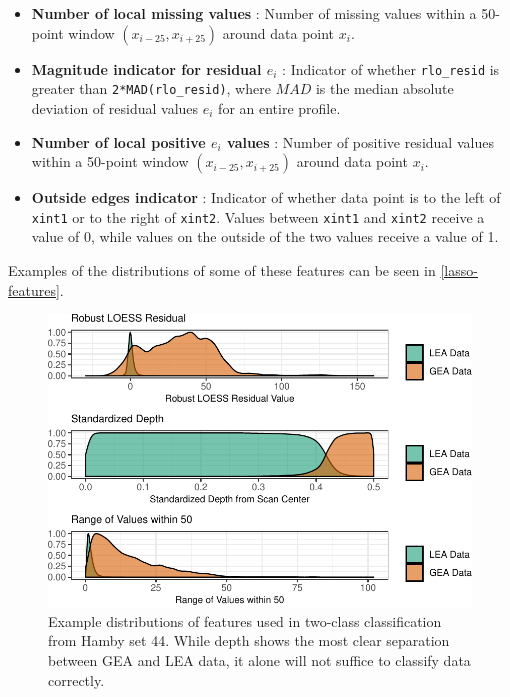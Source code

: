 \documentclass[12pt]{article}
\begin{document}
\begin{itemize}
\item[] \textbf{Number of local missing values} {}: Number of missing values within a 50-point window $(x_{i-25}, x_{i+25})$ around data point $x_i$.  

\item[] \textbf{Magnitude indicator for residual $e_i$} {}: Indicator of whether \texttt{rlo\_resid} is greater than \texttt{2*MAD(rlo\_resid)}, where $MAD$ is the median absolute deviation of residual values $e_i$ for an entire profile.    

\item[] \textbf{Number of local positive $e_i$ values} {}: Number of positive residual values within a 50-point window $(x_{i-25}, x_{i+25})$ around data point $x_i$.  

\item[] \textbf{Outside edges indicator} {}: Indicator of whether data point is to the left of \texttt{xint1} or to the right of \texttt{xint2}. Values between \texttt{xint1} and \texttt{xint2} receive a value of 0, while values on the outside of the two values receive a value of 1.  

\end{itemize}

Examples of the distributions of some of these features can be seen in
\autoref{lasso-features}.
{\color{purple}{Where does the number 50 come from in Figure 7 bottom graph?}}

\begin{figure}
\centering
\includegraphics{writeup_files/figure-latex/lasso-features-1.pdf}
\caption{\label{lasso-features}Example distributions of features used in
two-class classification from Hamby set 44. While depth shows the most
clear separation between GEA and LEA data, it alone will not suffice to
classify data correctly.}
\end{figure}
\end{document}
